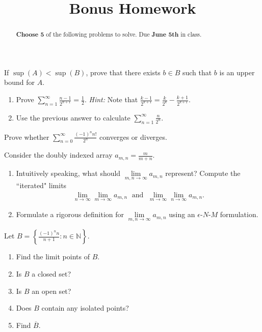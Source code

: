 \documentclass{ximera}
\begin{document}
    \title{Bonus Homework}
    \begin{abstract} \textbf{Choose 5} of the following problems to solve.  Due \textbf{June 5th} in class. \end{abstract}
    \maketitle

\begin{exercise}
    If $\sup(A) < \sup(B)$, prove that there exists $b \in B$ such that $b$ is an upper bound for $A$.
\end{exercise}

\begin{exercise}
    \begin{enumerate}
        \item Prove $\sum\limits_{n=1}^\infty \frac{n-1}{2^{n+1}} = \frac12$.  \textit{Hint:} Note that $\frac{k-1}{2^{k+1}} = \frac{k}{2^k} - \frac{k+1}{2^{k+1}}$.
        \item Use the previous answer to calculate $\sum\limits_{n=1}^\infty \frac{n}{2^{n}}$.
    \end{enumerate}
\end{exercise}

\begin{exercise}
    Prove whether $\sum\limits_{n=0}^\infty \frac{(-1)^n n!}{2^n}$ converges or diverges.
\end{exercise}

\begin{exercise}
    Consider the doubly indexed array $a_{m,n} = \frac{m}{m+n}$.
    \begin{enumerate}
        \item Intuitively speaking, what should $\lim\limits_{m,n \to \infty} a_{m,n}$ represent?  Compute the ``iterated" limits
        \begin{align*}
            \lim\limits_{n\to\infty}\lim\limits_{m\to \infty}a_{m,n} \; \text{ and } \; \lim\limits_{m\to\infty}\lim\limits_{n\to \infty}a_{m,n}.
        \end{align*}
        \item Formulate a rigorous definition for $\lim\limits_{m,n \to \infty} a_{m,n}$ using an $\epsilon$-$N$-$M$ formulation.
    \end{enumerate}
\end{exercise}

\begin{exercise}
    Let $B = \left\{ \frac{(-1)^nn}{n+1}: n \in \mathbb{N}\right\}$.
    \begin{enumerate}
        \item Find the limit points of $B$.
        \item Is $B$ a closed set?
        \item Is $B$ an open set?
        \item Does $B$ contain any isolated points?
        \item Find $\overline{B}$.
    \end{enumerate}
\end{exercise}
\end{document}
